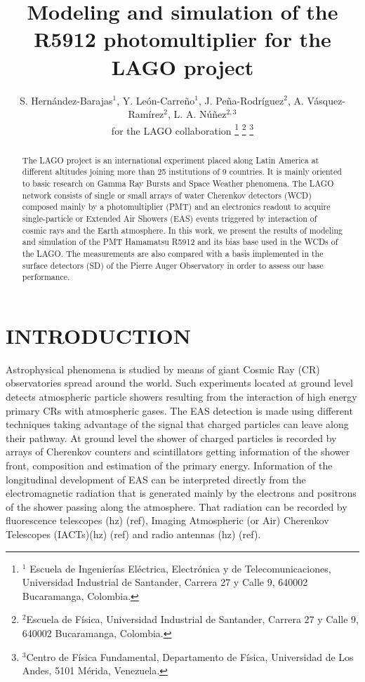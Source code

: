 \documentclass[letterpaper, 10 pt, conference]{ieeeconf}  %
\title{\LARGE \bf
Modeling and simulation of the R5912 photomultiplier for the LAGO project
}
\author{S. Hern\'andez-Barajas$^{1}$, Y. Le\'on-Carre\~no$^{1}$, J. Pe\~na-Rodr\'iguez$^{2}$, A. V\'asquez-Ram\'irez$^{2}$, L. A. N\'u\~nez$^{2,3}$\\ for the LAGO collaboration%
\thanks{$^{1}$ Escuela de Ingenierías El\'ectrica, Electr\'onica y de Telecomunicaciones, Universidad Industrial de Santander, Carrera 27 y Calle 9, 640002 Bucaramanga, Colombia.
}
\thanks{$^{2}$Escuela de F\'isica, Universidad Industrial de Santander, Carrera 27 y Calle 9, 640002 Bucaramanga, Colombia.}
\thanks{$^{3}$Centro de F\'isica Fundamental, Departamento de F\'isica, Universidad de Los Andes, 5101 M\'erida, Venezuela.}
}
\begin{document}
\maketitle
\thispagestyle{empty}
\pagestyle{empty}


\begin{abstract}
The LAGO project is an international experiment placed along Latin America at different altitudes joining more than 25 institutions of 9 countries. It is mainly oriented to basic research on Gamma Ray Bursts and Space Weather phenomena. The LAGO network consists of single or small arrays of water Cherenkov detectors (WCD) composed mainly by a photomultiplier (PMT) and an electronics readout to acquire single-particle or Extended Air Showers (EAS) events triggered by interaction of cosmic rays and the Earth atmosphere. In this work, we present the results of modeling and simulation of the PMT Hamamatsu R5912 and its bias base used in the WCDs of the LAGO. The measurements are also compared with a basis implemented in the surface detectors (SD) of the Pierre Auger Observatory in order to assess our base performance.
\end{abstract}


\section{INTRODUCTION}

Astrophysical phenomena is studied by means of giant Cosmic Ray (CR) observatories spread around the world. Such experiments located at ground level detects atmospheric particle showers resulting from the interaction of high energy primary CRs with atmospheric gases. The EAS detection is made using different techniques taking advantage of the signal that charged particles can leave along their pathway. At ground level the shower of charged particles is recorded by arrays of Cherenkov counters and scintillators getting information of the shower front, composition and estimation of the primary energy. Information of the longitudinal development of EAS can be interpreted directly from the electromagnetic radiation that is generated mainly by the electrons and positrons of the shower passing along the atmosphere. That radiation can be recorded by fluorescence telescopes (hz) (ref), Imaging Atmospheric (or Air) Cherenkov Telescopes (IACTs)(hz) (ref) and radio antennas (hz) (ref).
\end{document}
